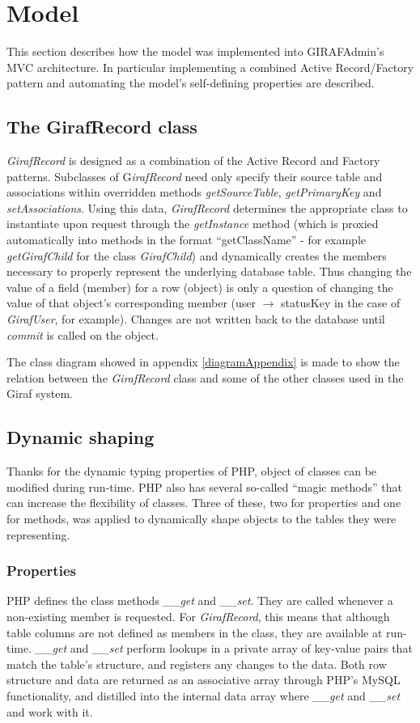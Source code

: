 \section{Model}
\label{model}
This section describes how the model was implemented into GIRAFAdmin's MVC architecture. In particular implementing a combined Active Record/Factory pattern and automating the model's self-defining properties are described.

\subsection{The GirafRecord class}
\emph{GirafRecord} is designed as a combination of the Active Record and Factory patterns. Subclasses of G\emph{irafRecord} need only specify their source table and associations within overridden methods \emph{getSourceTable}, \emph{getPrimaryKey} and \emph{setAssociations}. Using this data, \emph{GirafRecord} determines the appropriate class to instantiate upon request through the \emph{getInstance} method (which is proxied automatically into methods in the format ``getClassName'' - for example \emph{getGirafChild} for the class \emph{GirafChild}) and dynamically creates the members necessary to properly represent the underlying database table. Thus changing the value of a field (member) for a row (object) is only a question of changing the value of that object's corresponding member (user $\rightarrow$ statusKey in the case of \emph{GirafUser}, for example). Changes are not written back to the database until \emph{commit} is called on the object.

The class diagram showed in appendix \ref{diagramAppendix} is made to show the relation between the \emph{GirafRecord} class and some of the other classes used in the Giraf system.

\subsection{Dynamic shaping}
Thanks for the dynamic typing properties of PHP, object of classes can be modified during run-time. PHP also has several so-called ``magic methods'' that can increase the flexibility of classes. Three of these, two for properties and one for methods, was applied to dynamically shape objects to the tables they were representing.

\subsubsection*{Properties}
PHP defines the class methods \emph{\_\_get} and \emph{\_\_set}. They are called whenever a non-existing member is requested. For \emph{GirafRecord}, this means that although table columns are not defined as members in the class, they are available at run-time. \emph{\_\_get} and \emph{\_\_set} perform lookups in a private array of key-value pairs that match the table's structure, and registers any changes to the data.
Both row structure and data are returned as an associative array through PHP's MySQL functionality, and distilled into the internal data array where \emph{\_\_get} and \emph{\_\_set} and work with it.

